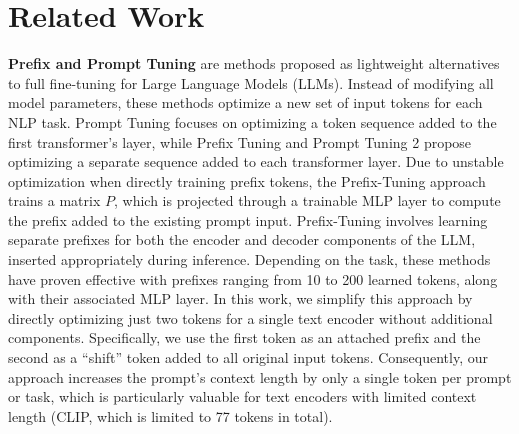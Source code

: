 \section{Related Work}
\label{sec:related_work}


{\bf Prefix and Prompt Tuning} \citep{prompt_tunning,prompt_tunning2,prefix_tunning} are methods proposed as lightweight alternatives to full fine-tuning for Large Language Models (LLMs). Instead of modifying all model parameters, these methods optimize a new set of input tokens for each NLP task. Prompt Tuning \citep{prompt_tunning} focuses on optimizing a token sequence added to the first transformer's layer, while Prefix Tuning \citep{prefix_tunning} and Prompt Tuning 2 \citep{prompt_tunning2} propose optimizing a separate sequence added to each transformer layer. Due to unstable optimization when directly training prefix tokens, the Prefix-Tuning approach \citep{prefix_tunning} trains a matrix $P$, which is projected through a trainable MLP layer to compute the prefix added to the existing prompt input. Prefix-Tuning involves learning separate prefixes for both the encoder and decoder components of the LLM, inserted appropriately during inference. Depending on the task, these methods have proven effective with prefixes ranging from 10 to 200 learned tokens, along with their associated MLP layer. In this work, we simplify this approach by directly optimizing just two tokens for a single text encoder without additional components. Specifically, we use the first token as an attached prefix and the second as a ``shift'' token added to all original input tokens. Consequently, our approach increases the prompt’s context length by only a single token per prompt or task, which is particularly valuable for text encoders with limited context length (\eg CLIP, which is limited to 77 tokens in total). 

